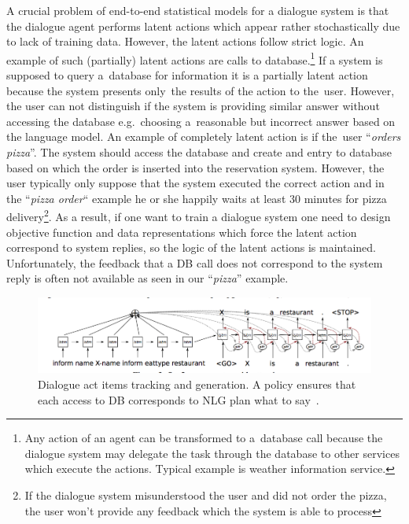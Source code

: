 \documentclass[11pt]{article}
\begin{document}
A crucial problem of end-to-end statistical models for a dialogue system is that the dialogue agent performs latent actions which appear rather stochastically due to lack of training data.
However, the latent actions follow strict logic.
An example of such (partially) latent actions are calls to database.\footnote{Any action of an agent can be transformed to a~database call because the dialogue system may delegate the task through the database to other services which execute the actions. Typical example is weather information service.}
If a system is supposed to query a~database for information it is a partially latent action because the system presents only~the results of the action to the~user.
However, the user can not distinguish if the system is providing similar answer without accessing the database e.g.~choosing a~reasonable but incorrect answer based on the language model.
An example of completely latent action is if the~user ``{\it orders pizza}''.
The system should access the database and create and entry to database based on which the order is inserted into the reservation system.
However, the user typically only suppose that the system executed the correct action and in the ``{\it pizza order}`` example he or she happily waits at least 30 minutes for pizza delivery\footnote{If the dialogue system misunderstood the user and did not order the pizza, the user won't provide any feedback which the system is able to process}.
As a result, if one want to train a dialogue system one need to design objective function and data representations which force the latent action correspond to system replies, so the logic of the latent actions is maintained.
Unfortunately, the feedback that a DB call does not correspond to the system reply is often not available as seen in our ``{\it pizza}'' example.

\begin{figure}[htb]
    \centering
    \includegraphics[width=1.0\linewidth]{dusek_seq2seq}
    \caption{Dialogue act items tracking and generation. A policy ensures that each access to DB corresponds to NLG plan what to say~\cite{dusek_sequence2sequence_2016}.}
\label{fig:dai_gen}
\end{figure}
\end{document}
